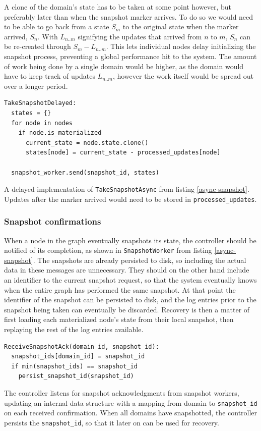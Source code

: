 \documentclass[b5paper]{report}
\begin{document}
A clone of the domain's state has to be taken at some point however, but
preferably later than when the snapshot marker arrives. To do so we would need
to be able to go back from a state $ S_m $ to the original state when the marker
arrived, $ S_n $. With $ L_{n..m} $ signifying the updates that arrived from $ n
$ to $ m $, $ S_n $ can be re-created through $ S_m - L_{n..m} $. This lets
individual nodes delay initializing the snapshot process, preventing a global
performance hit to the system. The amount of work being done by a single domain
would be higher, as the domain would have to keep track of updates $ L_{n..m} $,
however the work itself would be spread out over a longer period.

\begin{listing}[H]
  \begin{verbatim}
TakeSnapshotDelayed:
  states = {}
  for node in nodes
    if node.is_materialized
      current_state = node.state.clone()
      states[node] = current_state - processed_updates[node]

  snapshot_worker.send(snapshot_id, states)
  \end{verbatim}
  \caption{
    A delayed implementation of \texttt{TakeSnapshotAsync} from listing
    \ref{async-snapshot}. Updates after the marker arrived would need to be stored
    in \texttt{processed\_updates}.
  }
\end{listing}

\subsubsection{Snapshot confirmations}
When a node in the graph eventually snapshots its state, the controller should
be notified of its completion, as shown in \texttt{SnapshotWorker} from listing
\ref{async-snapshot}. The snapshots are already persisted to disk, so including
the actual data in these messages are unnecessary. They should on the other
hand include an identifier to the current snapshot request, so that the system
eventually knows when the entire graph has performed the same snapshot. At that
point the identifier of the snapshot can be persisted to disk, and the log
entries prior to the snapshot being taken can eventually be discarded.
Recovery is then a matter of first loading each materialized node's state from
their local snapshot, then replaying the rest of the log entries available.

\begin{listing}[H]
  \begin{verbatim}
ReceiveSnapshotAck(domain_id, snapshot_id):
  snapshot_ids[domain_id] = snapshot_id
  if min(snapshot_ids) == snapshot_id
    persist_snapshot_id(snapshot_id)
  \end{verbatim}
  \caption{
    The controller listens for snapshot acknowledgments from snapshot
    workers, updating an internal data structure with a mapping from domain to
    \texttt{snapshot\_id} on each received confirmation. When all domains have
    snapshotted, the controller persists the \texttt{snapshot\_id}, so that it
    later on can be used for recovery.
    \label{snapshot_acks}
  }
\end{listing}
\end{document}
